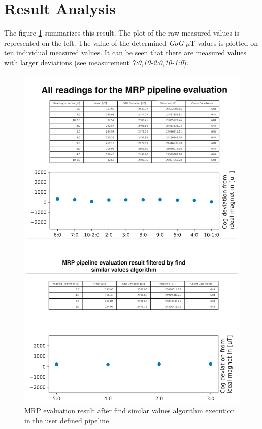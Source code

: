 \hypertarget{result-analysis}{%
\section{Result Analysis}\label{result-analysis}}

The figure
\ref{MRP_evaluation_result_after_find_similar_values_algorithm_execution_in_the_user_defined_pipeline.png}
summarizes this result. The plot of the raw measured values is
represented on the left. The value of the determined \emph{GoG} \(\mu\)T
values is plotted on ten individual measured values. It can be seen that
there are measured values with larger deviations (see measurement
\emph{7:0},\emph{10-2:0},\emph{10-1:0}).

\begin{figure}
\centering
\includegraphics{./generated_images/border_MRP_evaluation_result_after_find_similar_values_algorithm_execution_in_the_user_defined_pipeline.png}
\caption{MRP evaluation result after find similar values algorithm
execution in the user defined pipeline
\label{MRP_evaluation_result_after_find_similar_values_algorithm_execution_in_the_user_defined_pipeline.png}}
\end{figure}

